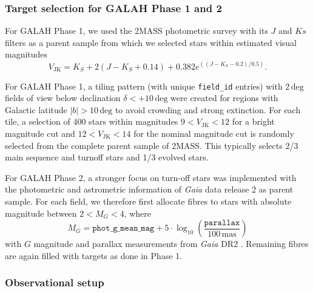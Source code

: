 \documentclass[
  journal=pasa,
  manuscript=research-paper, %
  year=2024,
  volume=37
]{cup-journal}
\newcommand{\Gaia}{\textit{Gaia}\xspace}
\begin{document}
\subsubsection{Target selection for GALAH Phase 1 and 2}

For GALAH Phase 1, we used the 2MASS photometric survey \citep{Skrutskie2006} with its $J$ and $Ks$ filters as a parent sample from which we selected stars within estimated visual magnitudes
\begin{equation}
V_\mathrm{JK} = K_S+2(J-K_S+0.14)+0.382e^{((J-K_S-0.2)/0.5)}.
\end{equation}

For GALAH Phase 1, a tiling pattern (with unique \texttt{field\_id} entries) with $2\,\mathrm{deg}$ fields of view below declination $\delta < +10\,\mathrm{deg}$ were created for regions with Galactic latitude $\vert b \vert > 10\,\mathrm{deg}$ to avoid crowding and strong extinction. For each tile, a selection of 400 stars within magnitudes $9 < V_\mathrm{JK} < 12$ for a bright magnitude cut and $12 < V_\mathrm{JK} < 14$ for the nominal magnitude cut is randomly selected from the complete parent sample of 2MASS. This typically selects 2/3 main sequence and turnoff stars and 1/3 evolved stars.

For GALAH Phase 2, a stronger focus on turn-off stars was implemented with the photometric and astrometric information of \Gaia data release 2 as parent sample. For each field, we therefore first allocate fibres to stars with absolute magnitude between $2 < M_G < 4$, where
\begin{equation}
M_G = \texttt{phot\_g\_mean\_mag} + 5 \cdot \log_{10} \left( \frac{\texttt{parallax}}{100\,\mathrm{mas}} \right)
\end{equation}
with $G$ magnitude and parallax measurements from \Gaia DR2 \citep{Brown2018, Evans2018, Lindegren2018}. Remaining fibres are again filled with targets as done in Phase 1.

\subsubsection{Observational setup}
\end{document}
